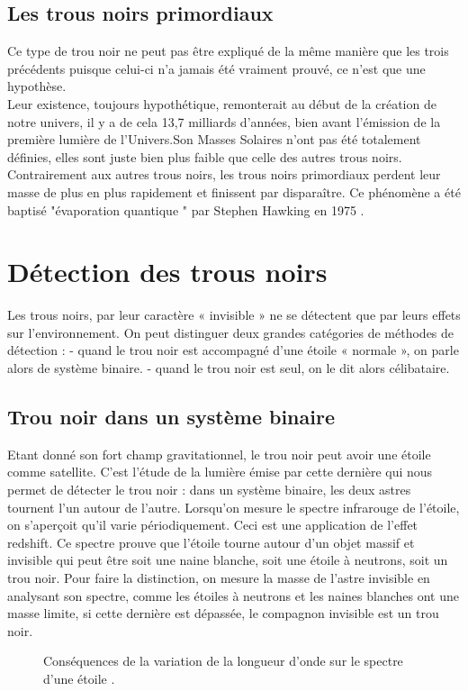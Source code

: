 	\subsection{ Les trous noirs primordiaux } 
	Ce type de trou noir ne peut pas être expliqué de la même manière que les trois précédents puisque celui-ci n'a jamais été vraiment prouvé, ce n'est que une hypothèse.\\ 
	Leur existence, toujours hypothétique, remonterait au début de la création de notre univers, il y a de cela 13,7 milliards d'années, bien avant l’émission de la première lumière de l'Univers.Son Masses Solaires n'ont pas été totalement définies, elles sont juste bien plus faible que celle des autres trous noirs.\\
Contrairement aux autres trous noirs, les trous noirs primordiaux perdent leur masse
de plus en plus rapidement et finissent par disparaître. Ce phénomène a été baptisé "évaporation quantique " par Stephen Hawking en 1975 \cite{4}.
	\section{Détection des trous noirs } 
	Les trous noirs, par leur caractère « invisible » ne se détectent que par leurs effets sur l’environnement. On peut distinguer deux grandes catégories de méthodes de détection :
	- quand le trou noir est accompagné d’une étoile « normale », on parle alors	
	de système binaire.
	- quand le trou noir est seul, on le dit alors célibataire.	
	\subsection{ Trou noir dans un système binaire }
	Etant donné son fort champ gravitationnel, le trou noir peut avoir une étoile comme satellite. C’est l’étude de la lumière émise par cette dernière qui nous permet de détecter le trou noir : dans un système binaire, les deux astres tournent l’un autour de l’autre. Lorsqu’on mesure le spectre infrarouge de l’étoile, on s’aperçoit qu’il varie périodiquement. Ceci est une application de l’effet redshift.
	Ce spectre prouve que l’étoile tourne autour d’un objet massif et invisible qui peut être soit une naine blanche, soit une étoile à neutrons, soit un trou noir. Pour faire la distinction, on mesure la masse de l’astre invisible en analysant son spectre, comme les étoiles à neutrons et les naines blanches ont une masse limite, si cette dernière est dépassée, le compagnon invisible est un trou noir.\\
	\begin{figure}[H]
		\begin{center}
			\centering

\caption{Conséquences de la variation de la longueur d'onde sur le spectre d'une étoile .}

	\end{center}
\end{figure}

